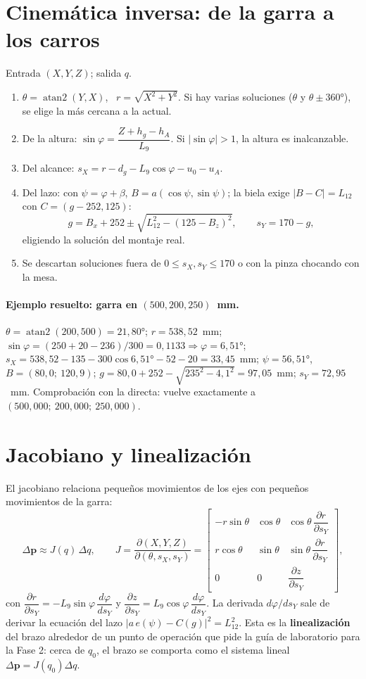 \section{Cinemática inversa: de la garra a los carros}
Entrada $(X, Y, Z)$; salida $q$.
\begin{enumerate}
\item $\theta = \operatorname{atan2}(Y, X)$, \ $r = \sqrt{X^2 + Y^2}$. Si hay varias soluciones ($\theta$ y $\theta \pm 360°$), se elige la más cercana a la actual.
\item De la altura: $\sin\varphi = \dfrac{Z + h_g - h_A}{L_9}$. Si $|\sin\varphi| > 1$, la altura es inalcanzable.
\item Del alcance: $s_X = r - d_g - L_9\cos\varphi - u_0 - u_A$.
\item Del lazo: con $\psi = \varphi + \beta$, $B = a(\cos\psi, \sin\psi)$; la biela exige $|B - C| = L_{12}$ con $C = (g - 252, 125)$:
\[
g = B_x + 252 \pm \sqrt{L_{12}^2 - (125 - B_z)^2}, \qquad s_Y = 170 - g,
\]
eligiendo la solución del montaje real.
\item Se descartan soluciones fuera de $0 \le s_X, s_Y \le 170$ o con la pinza chocando con la mesa.
\end{enumerate}

\paragraph{Ejemplo resuelto: garra en $(500, 200, 250)$~mm.} $\theta = \operatorname{atan2}(200, 500) = 21{,}80°$; $r = 538{,}52$~mm; $\sin\varphi = (250 + 20 - 236)/300 = 0{,}1133 \Rightarrow \varphi = 6{,}51°$; $s_X = 538{,}52 - 135 - 300\cos 6{,}51° - 52 - 20 = 33{,}45$~mm; $\psi = 56{,}51°$, $B = (80{,}0;\ 120{,}9)$; $g = 80{,}0 + 252 - \sqrt{235^2 - 4{,}1^2} = 97{,}05$~mm; $s_Y = 72{,}95$~mm. Comprobación con la directa: vuelve exactamente a $(500{,}000;\ 200{,}000;\ 250{,}000)$.

\section{Jacobiano y linealización}\label{sec:jacobiano}
El jacobiano relaciona pequeños movimientos de los ejes con pequeños movimientos de la garra:
\[
\Delta\mathbf{p} \approx J(q)\,\Delta q, \qquad
J = \frac{\partial(X, Y, Z)}{\partial(\theta, s_X, s_Y)} =
\begin{bmatrix}
-r\sin\theta & \cos\theta & \cos\theta\,\dfrac{\partial r}{\partial s_Y}\\[6pt]
r\cos\theta & \sin\theta & \sin\theta\,\dfrac{\partial r}{\partial s_Y}\\[6pt]
0 & 0 & \dfrac{\partial z}{\partial s_Y}
\end{bmatrix},
\]
con $\dfrac{\partial r}{\partial s_Y} = -L_9\sin\varphi\,\dfrac{d\varphi}{ds_Y}$ y $\dfrac{\partial z}{\partial s_Y} = L_9\cos\varphi\,\dfrac{d\varphi}{ds_Y}$. La derivada $d\varphi/ds_Y$ sale de derivar la ecuación del lazo $|a\,e(\psi) - C(g)|^2 = L_{12}^2$. Esta es la \textbf{linealización} del brazo alrededor de un punto de operación que pide la guía de laboratorio para la Fase 2: cerca de $q_0$, el brazo se comporta como el sistema lineal $\Delta\mathbf{p} = J(q_0)\Delta q$.

